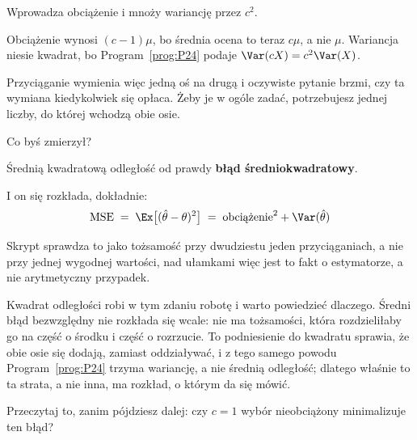 \begin{fr}
\begin{ansblock}
Wprowadza obciążenie i mnoży wariancję przez $c^{2}$.
\end{ansblock}

Obciążenie wynosi $(c-1)\mu$, bo średnia ocena to teraz $c\mu$, a nie $\mu$.
Wariancja niesie kwadrat, bo Program~\ref{prog:P24} podaje
$\Var(cX) = c^{2}\Var(X)$.

Przyciąganie wymienia więc jedną oś na drugą i oczywiste pytanie brzmi, czy
ta wymiana kiedykolwiek się opłaca. Żeby je w ogóle zadać, potrzebujesz
jednej liczby, do której wchodzą obie osie.

Co byś zmierzył?
\dotline
\nextframe
\end{fr}

\begin{fr}
\begin{ansblock}
Średnią kwadratową odległość od prawdy \dash{} \textbf{błąd
średniokwadratowy}.
\end{ansblock}

I on się rozkłada, dokładnie:
\[ \mathrm{MSE} \;=\; \Ex\bigl[(\hat\theta - \theta)^{2}\bigr]
   \;=\; \text{obciążenie}^{2} + \Var(\hat\theta) \]

Skrypt sprawdza to jako tożsamość przy dwudziestu jeden przyciąganiach, a nie
przy jednej wygodnej wartości, nad ułamkami \dash{} więc jest to fakt o
estymatorze, a nie arytmetyczny przypadek.

Kwadrat odległości robi w tym zdaniu robotę i warto powiedzieć dlaczego.
Średni błąd bezwzględny nie rozkłada się wcale: nie ma tożsamości, która
rozdzieliłaby go na część o środku i część o rozrzucie. To podniesienie do
kwadratu sprawia, że obie osie się dodają, zamiast oddziaływać, i z tego
samego powodu Program~\ref{prog:P24} trzyma wariancję, a nie średnią
odległość; dlatego właśnie to ta strata, a nie inna, ma rozkład, o którym da
się mówić.

Przeczytaj to, zanim pójdziesz dalej: czy $c = 1$ \dash{} wybór
nieobciążony \dash{} minimalizuje ten błąd?
\dotline
\nextframe
\end{fr}

